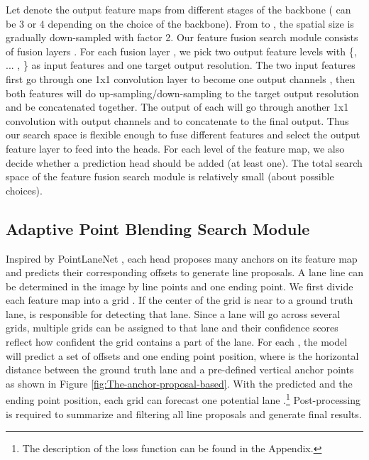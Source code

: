 \documentclass[runningheads]{llncs}
\begin{document}
Let  denote the output feature maps from different stages
of the backbone ( can be 3 or 4 depending on the choice of the
backbone). From  to , the spatial size is gradually
down-sampled with factor 2. Our feature fusion search module consists
of  fusion layers . For each fusion layer
, we pick two output feature levels with \{, ... ,
\} as input features and one target output resolution. The
two input features  first go through one 1x1 convolution layer
to become one output channels , then both features will do up-sampling/down-sampling
to the target output resolution and be concatenated together. The
output of each  will go through another 1x1 convolution with
output channels  and to concatenate to the final output. Thus
our search space is flexible enough to fuse different features and
select the output feature layer to feed into the heads. For each level
of the feature map, we also decide whether a prediction head should
be added (at least one). The total search space of the feature fusion
search module is relatively small (about  possible choices).

\subsection{Adaptive Point Blending Search Module\label{subsec:Anchor-proposal-based-Lane}}

Inspired by PointLaneNet \cite{chen2019pointlanenet}, each head proposes
many anchors on its feature map and predicts their corresponding offsets
to generate line proposals. A lane line can be determined in the image
by line points and one ending point. We first divide each feature
map into a  \texttimes{}  grid . If the center
of the grid  is near to a ground truth lane,  is
responsible for detecting that lane. Since a lane will go across several
grids, multiple grids can be assigned to that lane and their confidence
scores  reflect how confident the grid contains a part of
the lane. For each , the model will predict a set of offsets
 and one ending point position, where 
is the horizontal distance between the ground truth lane and a pre-defined
vertical anchor points  as shown in Figure \ref{fig:The-anchor-proposal-based}.
With the predicted  and the ending point position,
each grid  can forecast one potential lane .\footnote{The description of the loss function can be found in the Appendix.}
 Post-processing is required to summarize and filtering all line
proposals and generate final results.
\end{document}

